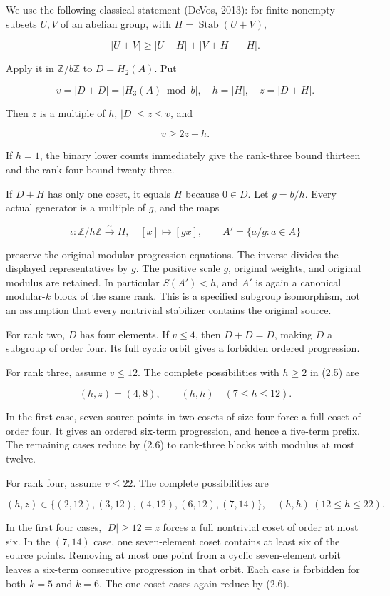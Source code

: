 We use the following classical statement (DeVos, 2013): for finite nonempty subsets \(U,V\) of an abelian group, with \(H=\operatorname{Stab}(U+V)\),

\[
|U+V|\ge|U+H|+|V+H|-|H|.
\tag{2.4}
\]

Apply it in \(\mathbb Z/b\mathbb Z\) to \(D=H_2(A)\). Put

\[
v=|D+D|=|H_3(A)\bmod b|,\quad h=|H|,\quad z=|D+H|.
\]

Then \(z\) is a multiple of \(h\), \(|D|\le z\le v\), and

\[
v\ge2z-h.
\tag{2.5}
\]

If \(h=1\), the binary lower counts immediately give the rank-three bound thirteen and the rank-four bound twenty-three.

If \(D+H\) has only one coset, it equals \(H\) because \(0\in D\). Let \(g=b/h\). Every actual generator is a multiple of \(g\), and the maps

\[
\iota:\mathbb Z/h\mathbb Z\overset\sim\longrightarrow H,
\quad[x]\longmapsto[gx],\qquad
A'=\{a/g:a\in A\}
\tag{2.6}
\]

preserve the original modular progression equations. The inverse divides the displayed representatives by \(g\). The positive scale \(g\), original weights, and original modulus are retained. In particular \(S(A')<h\), and \(A'\) is again a canonical modular-\(k\) block of the same rank. This is a specified subgroup isomorphism, not an assumption that every nontrivial stabilizer contains the original source.

For rank two, \(D\) has four elements. If \(v\le4\), then \(D+D=D\), making \(D\) a subgroup of order four. Its full cyclic orbit gives a forbidden ordered progression.

For rank three, assume \(v\le12\). The complete possibilities with \(h\ge2\) in (2.5) are

\[
(h,z)=(4,8),\qquad (h,h)\quad(7\le h\le12).
\tag{2.7}
\]

In the first case, seven source points in two cosets of size four force a full coset of order four. It gives an ordered six-term progression, and hence a five-term prefix. The remaining cases reduce by (2.6) to rank-three blocks with modulus at most twelve.

For rank four, assume \(v\le22\). The complete possibilities are

\[
(h,z)\in\{(2,12),(3,12),(4,12),(6,12),(7,14)\},
\quad (h,h)\ (12\le h\le22).
\tag{2.8}
\]

In the first four cases, \(|D|\ge12=z\) forces a full nontrivial coset of order at most six. In the \((7,14)\) case, one seven-element coset contains at least six of the source points. Removing at most one point from a cyclic seven-element orbit leaves a six-term consecutive progression in that orbit. Each case is forbidden for both \(k=5\) and \(k=6\). The one-coset cases again reduce by (2.6).

